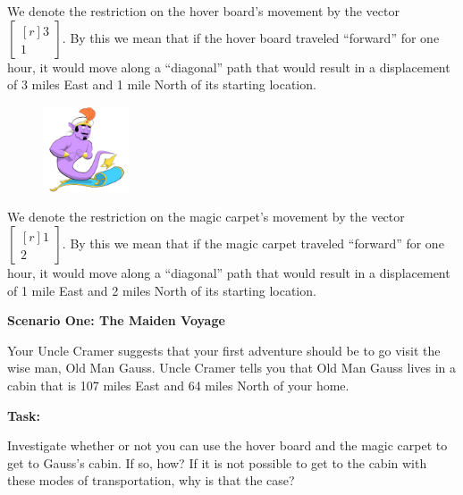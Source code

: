 \documentclass{problemset}
\newcommand{\mat}[1]{\begin{bmatrix*}[r]#1\end{bmatrix*}}
\begin{document}
\begin{iola}
\begin{minipage}{\textwidth}
	We denote the restriction on the hover board's movement by the vector
	$\mat{3 \\1}$. By this we mean that if
	the hover board traveled ``forward'' for one hour, it would move along a
	``diagonal'' path that would result in a displacement of 3 miles East and
	1 mile North of its starting location.
\end{minipage}

\begin{minipage}{\textwidth}
	\vspace{.5cm}
	\begin{figure}
	\vspace{-.8cm}
	\includegraphics[width=1in]{images/MagicCarpet-small.png}
	\end{figure}

	We denote the restriction on the magic carpet's movement by the vector
	$\mat{1 \\2 }$. By this we mean that if the
	magic carpet traveled ``forward'' for one hour, it would move along a
	``diagonal'' path that would result in a displacement of 1 mile East and
	2 miles North of its starting location.
\end{minipage}


\vspace{10mm}

\textbf{Scenario One: The Maiden Voyage}

Your Uncle Cramer suggests that your first adventure should be to go visit
the wise man, Old Man Gauss. Uncle Cramer tells you that Old Man Gauss
lives in a cabin that is 107 miles East and 64 miles North of your home.

\vspace{5mm}

\textbf{Task:}
\par
Investigate whether or not you can use the hover board and the magic
carpet to get to Gauss's cabin. If so, how? If it is not possible to
get to the cabin with these modes of transportation, why is that the case?

\end{iola}
\end{document}
